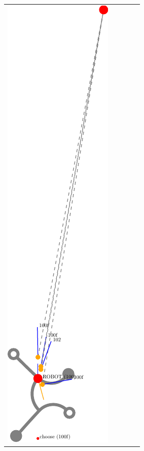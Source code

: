 \documentclass[10pt,a4paper]{article}
\begin{document}
\begin{tabular}{ccccc}
\includegraphics[scale=.8]{pics/pathplanner_without_noise/example_straight/dec_3.pdf}
&

\end{tabular}
\end{document}
